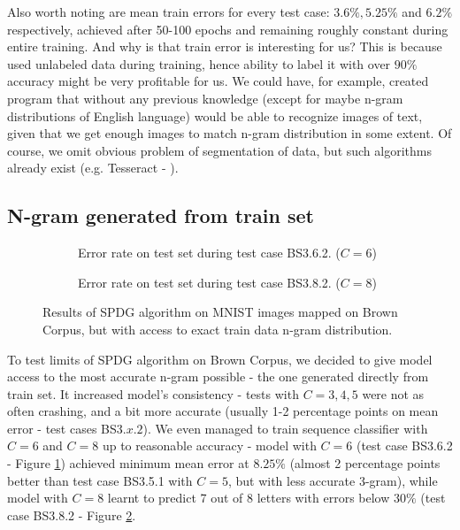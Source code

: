 \documentclass[shortabstract,lic,english]{iithesis}
\begin{document}
Also worth noting are mean train errors for every test case: $3.6\%, 5.25\%$ and $6.2\%$ respectively, achieved after 50-100 epochs and remaining roughly constant during entire training. And why is that train error is interesting for us? This is because used unlabeled data during training, hence ability to label it with over $90\%$ accuracy might be very profitable for us. We could have, for example, created program that without any previous knowledge (except for maybe n-gram distributions of English language) would be able to recognize images of text, given that we get enough images to match n-gram distribution in some extent. Of course, we omit obvious problem of segmentation of data, but such algorithms already exist (e.g. Tesseract - \cite{kay2007tesseract}).

\subsection{N-gram generated from train set}

\begin{figure}[ht]
\begin{subfigure}[b]{.49\textwidth}
    \def\svgwidth{\textwidth}
    
    \caption{Error rate on test set during test case BS3.6.2. ($C=6$)}
    \label{fig:tbs362_test_error}
\end{subfigure}
\begin{subfigure}[b]{.49\textwidth}
    \def\svgwidth{\textwidth}
    
    \caption{Error rate on test set during test case BS3.8.2. ($C=8$)}
    \label{fig:tbs382_test_error}
\end{subfigure}
\caption{Results of SPDG algorithm on MNIST images mapped on Brown Corpus, but with access to exact train data n-gram distribution.}
\label{fig:tbs2_results}
\end{figure}

To test limits of SPDG algorithm on Brown Corpus, we decided to give model access to the most accurate n-gram possible - the one generated directly from train set. It increased model's consistency - tests with $C=3,4,5$ were not as often crashing, and a bit more accurate (usually 1-2 percentage points on mean error - test cases BS$3.x.2$). We even managed to train sequence classifier with $C=6$ and $C=8$ up to reasonable accuracy - model with $C=6$ (test case BS3.6.2 - Figure \ref{fig:tbs362_test_error}) achieved minimum mean error at $8.25\%$ (almost 2 percentage points better than test case BS3.5.1 with $C=5$, but with less accurate 3-gram), while model with $C=8$ learnt to predict 7 out of 8 letters with errors below $30\%$ (test case BS3.8.2 - Figure \ref{fig:tbs382_test_error}.
\end{document}
